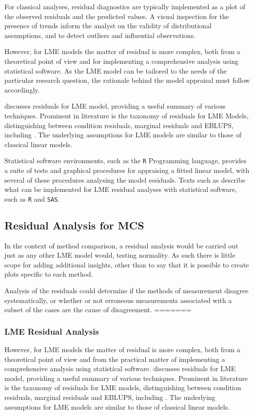 \documentclass[12pt, a4paper]{report}
\theoremstyle{plain}
\theoremstyle{definition}
\theoremstyle{remark}
\begin{document}
For classical analyses, residual diagnostics are typically implemented as a plot of the observed residuals and the predicted values. A visual inspection for the presence of trends inform the analyst on the validity of distributional assumptions, and to detect outliers and influential observations. 
	
However, for LME models the matter of residual is more complex, both from a theoretical point of view and for implementing a comprehensive analysis using statistical software. As the LME model can be tailored to the needs of the particular research question, the rationale behind the model appraisal must follow accordingly.
	
\citet{schabenberger} discusses residuals for LME model, providing a useful summary of various techniques. Prominent in literature is the taxonomy of residuals for LME Models, distinguishing between condition residuals, marginal residuals and EBLUPS, including \citet{ HildenMinton, schabenberger, west, NobreSinger2011}. The underlying assumptions for LME models are similar to those of classical linear models. 
	
Statistical software environments, such as the \texttt{R} Programming language, provides a suite of tests and graphical procedures for appraising a fitted linear model, with several of these procedures analysing the model residuals. Texts such as \citet{PB,west,Galecki} describe what can be implemented for LME residual analyses with statistical software, such as \texttt{R} and \texttt{SAS}.
	
\subsection{Residual Analysis for MCS}	
In the context of method comparison, a residual analysis would be carried out just as any other LME model would, testing normality. As such there is little scope for adding additional insights, other than to say that it is possible to create plots specific to each method. 
	
Analysis of the residuals could determine if the methods of measurement disagree systematically, or whether or not erroneous measurements associated with a subset of the cases are the cause of disagreement. 
=======


\subsubsection{LME Residual Analysis}
However, for LME models the matter of residual is more complex, both from a theoretical point of view and from the practical matter of implementing a comprehensive analysis using statistical software. \citet{schabenberger} discusses residuals for LME model, providing a useful summary of various techniques. Prominent in literature is the taxonomy of residuals for LME models, distinguishing between condition residuals, marginal residuals and EBLUPS, including \citet{hildenminton, schabenberger, west, nobresinger2007}. The underlying assumptions for LME models are similar to those of classical linear models. 
	
\end{document}
